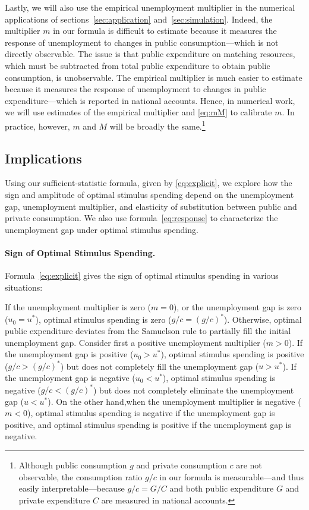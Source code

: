 \documentclass[letterpaper,12pt,leqno]{article}
\begin{document}
\begin{bibunit}
Lastly, we will also use the empirical unemployment multiplier in the numerical applications of sections~\ref{sec:application} and~\ref{sec:simulation}. Indeed, the multiplier $m$ in our formula is difficult to estimate because it measures the response of unemployment to changes in public consumption---which is not directly observable. The issue is that public expenditure on matching resources, which must be subtracted from total public expenditure to obtain public consumption, is unobservable. The empirical multiplier is much easier to estimate because it measures the response of unemployment to changes in public expenditure---which is reported in national accounts. Hence, in numerical work, we will use estimates of the empirical multiplier and \eqref{eq:mM} to calibrate $m$. In practice, however, $m$ and $M$ will be broadly the same.\footnote{Although public consumption $g$ and private consumption $c$ are not observable, the consumption ratio $g/c$ in our formula is measurable---and thus easily interpretable---because $g/c = G/C$ and both public expenditure $G$ and private expenditure $C$ are measured in national accounts.}

\subsection{Implications}

Using our sufficient-statistic formula, given by \eqref{eq:explicit}, we explore how the sign and amplitude of optimal stimulus spending depend on the unemployment gap, unemployment multiplier, and elasticity of substitution between public and private consumption. We also use formula~\eqref{eq:response} to characterize the unemployment gap under optimal stimulus spending. 

\paragraph{Sign of Optimal Stimulus Spending.} Formula~\eqref{eq:explicit} gives the sign of optimal stimulus spending in various situations:

\begin{prop}\label{prop:hump1} If the unemployment multiplier is zero ($m =0$), or the unemployment gap is zero ($u_{0}=u^{*}$), optimal stimulus spending is zero ($g/c=(g/c)^{*}$). Otherwise, optimal public expenditure deviates from the Samuelson rule to partially fill the initial unemployment gap. Consider first a positive unemployment multiplier ($m>0$). If the unemployment gap is positive ($u_{0}>u^{*}$), optimal stimulus spending is positive ($g/c>(g/c)^{*}$) but does not completely fill the unemployment gap ($u>u^{*}$). If the unemployment gap is negative ($u_{0}<u^{*}$), optimal stimulus spending is negative ($g/c<(g/c)^{*}$) but does not completely eliminate the unemployment gap ($u<u^{*}$). On the other hand,when the unemployment multiplier is negative ($m <0$), optimal stimulus spending is negative if the unemployment gap is positive, and optimal stimulus spending is positive if the unemployment gap is negative.\end{prop} 


\end{bibunit}
\end{document}
